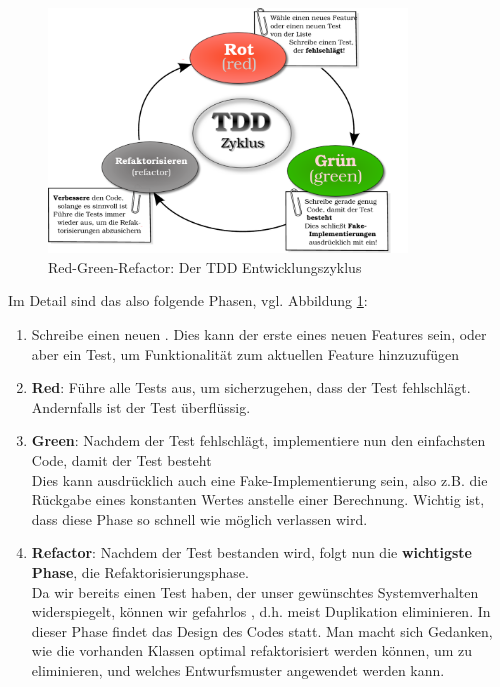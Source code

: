   \begin{figure}[htbp]
 \centering
 \includegraphics[width=0.85\textwidth]{./diagrams/red-green-refactor.pdf}
 \caption{Red-Green-Refactor: Der TDD Entwicklungszyklus}
 
 \label{fig:redgreenrefactor}
\end{figure}
  Im Detail sind das also folgende Phasen, vgl. Abbildung \ref{fig:redgreenrefactor}:
  \begin{enumerate}
   \item Schreibe einen neuen . Dies kann der erste eines neuen Features sein, oder aber ein Test, um Funktionalität zum aktuellen Feature hinzuzufügen
   \item \textbf{Red}: Führe alle Tests aus, um sicherzugehen, dass der Test fehlschlägt. Andernfalls ist der Test überflüssig.
   \item \textbf{Green}: Nachdem der Test fehlschlägt, implementiere nun den einfachsten Code, damit der Test besteht\\
   Dies kann ausdrücklich auch eine Fake-Implementierung sein, also z.B. die Rückgabe eines konstanten Wertes anstelle einer Berechnung. Wichtig ist, dass diese Phase so schnell wie möglich verlassen wird.
   \item \textbf{Refactor}: Nachdem der Test bestanden wird, folgt nun die \textbf{wichtigste Phase}, die Refaktorisierungsphase.\\
   Da wir bereits einen Test haben, der unser gewünschtes Systemverhalten widerspiegelt, können wir gefahrlos , d.h. meist Duplikation eliminieren. In dieser Phase findet das Design des Codes statt. Man macht sich Gedanken, wie die vorhanden Klassen optimal refaktorisiert werden können, um  zu eliminieren, und welches Entwurfsmuster angewendet werden kann.
  \end{enumerate}
  
